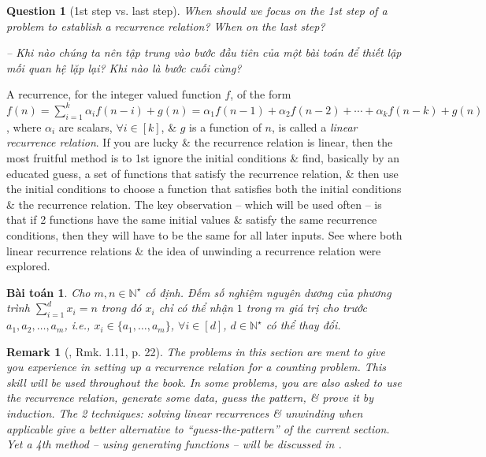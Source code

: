 \documentclass[oneside]{book}
\newtheorem{baitoan}{Bài toán}
\newtheorem{question}{Question}
\newtheorem{remark}{Remark}
\begin{document}
\begin{question}[1st step vs. last step]
	When should we focus on the 1st step of a problem to establish a recurrence relation? When on the last step?
	
	-- Khi nào chúng ta nên tập trung vào bước đầu tiên của một bài toán để thiết lập mối quan hệ lặp lại? Khi nào là bước cuối cùng?
\end{question}
A recurrence, for the integer valued function $f$, of the form $f(n) = \sum_{i=1}^k \alpha_if(n - i) + g(n) = \alpha_1f(n - 1) + \alpha_2f(n - 2) + \cdots + \alpha_kf(n - k) + g(n)$, where $\alpha_i$ are scalars, $\forall i\in[k]$, \& $g$ is a function of $n$, is called a {\it linear recurrence relation}. If you are lucky \& the recurrence relation is linear, then the most fruitful method is to 1st ignore the initial conditions \& find, basically by an educated guess, a set of functions that satisfy the recurrence relation, \& then use the initial conditions to choose a function that satisfies both the initial conditions \& the recurrence relation. The key observation -- which will be used often -- is that if 2 functions have the same initial values \& satisfy the same recurrence conditions, then they will have to be the same for all later inputs. See \cite[Sect. 1.4]{Shahriari2022} where both linear recurrence relations \& the idea of unwinding a recurrence relation were explored.

\begin{baitoan}
	Cho $m,n\in\mathbb{N}^\star$ cố định. Đếm số nghiệm nguyên dương của phương trình $\sum_{i=1}^d x_i = n$ trong đó $x_i$ chỉ có thể nhận $1$ trong $m$ giá trị cho trước $a_1,a_2,\ldots,a_m$, i.e., $x_i\in\{a_1,\ldots,a_m\}$, $\forall i\in[d]$, $d\in\mathbb{N}^\star$ có thể thay đổi.
\end{baitoan}

\begin{remark}[\cite{Shahriari2022}, Rmk. 1.11, p. 22]
	The problems in this section are ment to give you experience in setting up a recurrence relation for a counting problem. This skill will be used throughout the book. In some problems, you are also asked to use the recurrence relation, generate some data, guess the pattern, \& prove it by induction. The 2 techniques: solving linear recurrences \& unwinding when applicable give a better alternative to ``guess-the-pattern'' of the current section. Yet a 4th method -- using generating functions -- will be discussed in \cite[Chap. 9]{Shahriari2022}.
\end{remark}
\end{document}
